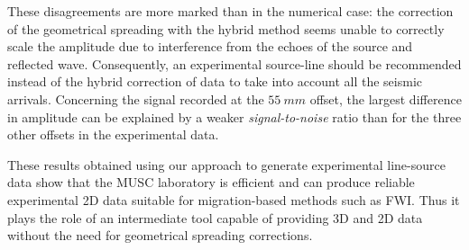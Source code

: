 \documentclass[paper,extra]{gji} %
\begin{document}

\noindent These disagreements are more marked than in the numerical case: the correction of the geometrical spreading with the hybrid method seems unable to correctly scale the amplitude due to interference from the echoes of the source and reflected wave. Consequently, an experimental source-line should be recommended instead of the hybrid correction of data to take into account all the seismic arrivals. Concerning the signal recorded at the $55\ mm$ offset, the largest difference in amplitude can be explained by a weaker \textit{signal-to-noise} ratio than for the three other offsets in the experimental data. 

\noindent These results obtained using our approach to generate experimental line-source data show that the MUSC laboratory is efficient and can produce reliable experimental 2D data suitable for migration-based methods such as FWI. Thus it plays the role of an intermediate tool capable of providing 3D and 2D data without the need for geometrical spreading corrections.
\end{document}
